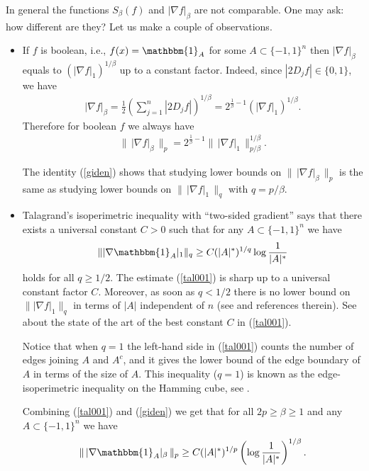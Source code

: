 \documentclass[11pt]{amsart}
\theoremstyle{definition}
\renewcommand{\1}{{\mathbbm{1}}}
\begin{document}
In general the functions $S_{\beta}(f)$ and $|\nabla f|_{\beta}$ are not comparable. One may ask: how different are they? Let us make a couple of observations. 

\begin{itemize}
\item[1.]If $f$ is boolean, i.e., $f(x) = \mathbbm{1}_{A}$ for some $A\subset  \{-1,1\}^{n}$ then $|\nabla f|_{\beta}$ equals to $(|\nabla f|_{1})^{1/\beta}$ up to a constant factor. Indeed, since $|2D_{j}f| \in \{0,1\}$, we have
\begin{align*}
|\nabla f|_{\beta} = \frac{1}{2}\left( \sum_{j=1}^{n} |2D_{j}f|\right)^{1/\beta} = 2^{\frac{1}{\beta}-1} (|\nabla f|_{1})^{1/\beta}. 
\end{align*}
Therefore  for boolean $f$ we always have
\begin{align}\label{giden}
\|\, |\nabla f|_{\beta} \,\|_{p} = 2^{\frac{1}{\beta}-1}  \|\, |\nabla f|_{1}\,\|_{p/\beta}^{1/\beta}.
\end{align}

The identity (\ref{giden}) shows that studying lower bounds on  $\|\, |\nabla f|_{\beta} \,\|_{p}$ is the same as studying lower bounds on $\|\, |\nabla f|_{1} \,\|_{q}$ with $q=p/\beta$. 


\item[2.] Talagrand's  isoperimetric inequality with ``two-sided gradient''    says that  there exists a universal constant $C>0$ such that for  any $A\subset  \{-1,1\}^{n}$ we have 
\begin{align}\label{tal001}
    \|  |\nabla \mathbbm{1}_{A}|_{1} \|_{q} \geq C  (|A|^{*})^{1/q} \log\frac{1}{|A|^{*}}
\end{align}
holds for all $q\geq 1/2$. The estimate (\ref{tal001}) is sharp up to a universal constant factor $C$. Moreover, as soon as $q<1/2$ there is no lower bound on $\|  |\nabla f|_{1} \|_{q}$ in terms of $|A|$ independent of $n$ (see \cite{BIM} and references therein). See \cite{DIR} about the state of the art of the best constant $C$ in (\ref{tal001}).

Notice that when $q=1$ the left-hand side in (\ref{tal001}) counts the number of edges joining $A$ and $A^{c}$, and it gives the lower bound of the edge boundary of $A$ in terms of the size of $A$. This inequality ($q=1$) is known as the edge-isoperimetric inequality on the Hamming cube, see \cite{hart}. 

Combining (\ref{tal001}) and (\ref{giden}) we get that for all $2p \geq \beta \geq 1$ and any $A\subset  \{-1,1\}^{n}$  we have 
\begin{align}\label{taliso}
    \|\, |\nabla \mathbbm{1}_{A}|_{\beta} \,\|_{p} \geq C  (|A|^{*})^{1/p} \left(\log\frac{1}{|A|^{*}}\right)^{1/\beta}.
\end{align}


\end{itemize}
\end{document}
